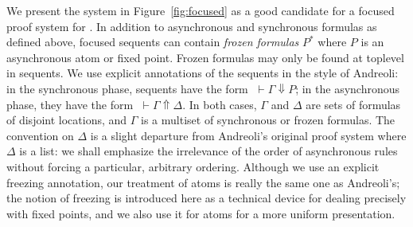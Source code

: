 We present the system in Figure~\ref{fig:focused} as a good
candidate for a focused proof system for \mumall.
In addition to asynchronous and synchronous formulas as defined above,
focused sequents can contain \emph{frozen formulas} $P^*$
where $P$ is an asynchronous atom or fixed point.
Frozen formulas may only be found at toplevel in sequents.
We use explicit annotations of the sequents in the style of Andreoli:
in the synchronous phase, sequents have the form
$\;\vdash \Gamma \Downarrow P$;
in the asynchronous phase, they have the form
$\;\vdash \Gamma \Uparrow \Delta$.
In both cases,
$\Gamma$ and $\Delta$ are sets of formulas of disjoint locations,
and $\Gamma$ is a multiset of synchronous or frozen formulas.
The convention on $\Delta$ is a slight departure from Andreoli's
original proof system where $\Delta$ is a list: we shall emphasize
the irrelevance of the order of asynchronous rules without
forcing a particular, arbitrary ordering.
Although we use an explicit freezing annotation,
our treatment of atoms is really the same one as Andreoli's;
the notion of freezing is introduced here as a technical device for
dealing precisely with fixed points,
and we also use it for atoms for a more uniform presentation.

